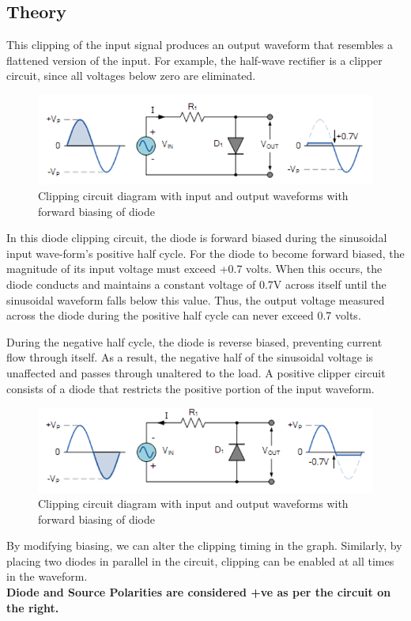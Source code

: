 \documentclass{article}
\begin{document}
\subsection{Theory}
This clipping of the input signal produces an output waveform that resembles a flattened version of the input. For example, the half-wave rectifier is a clipper circuit, since all voltages below zero are eliminated.\par
\begin{figure}[h!]
    \centering
    \includegraphics[width=1\textwidth]{pic6.png}
    \caption{Clipping circuit diagram with input and output waveforms with forward biasing of diode}
\end{figure}
In this diode clipping circuit, the diode is forward biased during the sinusoidal input wave-form's positive half cycle. For the diode to become forward biased, the magnitude of its input voltage must exceed +0.7 volts. When this occurs, the diode conducts and maintains a constant voltage of 0.7V across itself until the sinusoidal waveform falls below this value. Thus, the output voltage measured across the diode during the positive half cycle can never exceed 0.7 volts.\par
During the negative half cycle, the diode is reverse biased, preventing current flow through itself. As a result, the negative half of the sinusoidal voltage is unaffected and passes through unaltered to the load. A positive clipper circuit consists of a diode that restricts the positive portion of the input waveform.\par
\begin{figure}[h!]
    \centering
    \includegraphics[width=1\textwidth]{pic7.png}
    \caption{Clipping circuit diagram with input and output waveforms with forward biasing of diode}
\end{figure}
By modifying biasing, we can alter the clipping timing in the graph. Similarly, by placing two diodes in parallel in the circuit, clipping can be enabled at all times in the waveform.\\
\textbf{Diode and Source Polarities are considered +ve as per the circuit on the right.}
\end{document}

